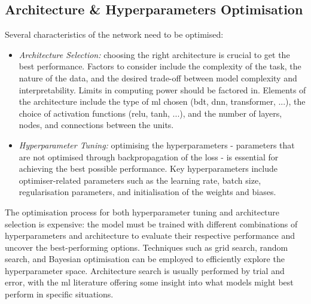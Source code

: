 \subsection{Architecture \& Hyperparameters Optimisation}
Several characteristics of the network need to be optimised: 
\begin{itemize}[leftmargin=*]
    \item \textit{Architecture Selection:} choosing the right architecture is crucial to get the best performance. Factors to consider include the complexity of the task, the nature of the data, and the desired trade-off between model complexity and interpretability. Limits in computing power should be factored in. Elements of the architecture include the type of \gls{ml} chosen (\gls{bdt}, \gls{dnn}, transformer, ...), the choice of activation functions (\gls{relu}, tanh, ...), and the number of layers, nodes, and connections between the units.
    \item \textit{Hyperparameter Tuning:} optimising the hyperparameters - parameters that are not optimised through backpropagation of the loss - is essential for achieving the best possible performance. Key hyperparameters include optimiser-related parameters such as the learning rate, batch size, regularisation parameters, and initialisation of the weights and biases.
\end{itemize}
The optimisation process for both hyperparameter tuning and architecture selection is expensive: the model must be trained with different combinations of hyperparameters and architecture to evaluate their respective performance and uncover the best-performing options. Techniques such as grid search, random search, and Bayesian optimisation can be employed to efficiently explore the hyperparameter space. Architecture search is usually performed by trial and error, with the \gls{ml} literature offering some insight into what models might best perform in specific situations. 

